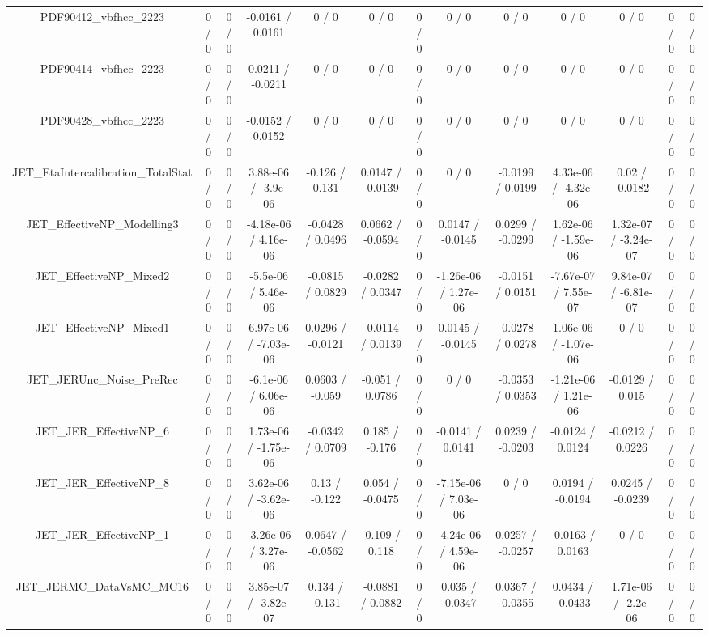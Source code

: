 \documentclass[10pt]{article}
\begin{document}
\begin{table}[htbp]
\begin{center}
\begin{tabular}{|c|c|c|c|c|c|c|c|c|c|c|c|c|}
  PDF90412_vbfhcc_2223 & 0 / 0 & 0 / 0 & -0.0161 / 0.0161 & 0 / 0 & 0 / 0 & 0 / 0 & 0 / 0 & 0 / 0 & 0 / 0 & 0 / 0 & 0 / 0 & 0 / 0 \\ 
  PDF90414_vbfhcc_2223 & 0 / 0 & 0 / 0 & 0.0211 / -0.0211 & 0 / 0 & 0 / 0 & 0 / 0 & 0 / 0 & 0 / 0 & 0 / 0 & 0 / 0 & 0 / 0 & 0 / 0 \\ 
  PDF90428_vbfhcc_2223 & 0 / 0 & 0 / 0 & -0.0152 / 0.0152 & 0 / 0 & 0 / 0 & 0 / 0 & 0 / 0 & 0 / 0 & 0 / 0 & 0 / 0 & 0 / 0 & 0 / 0 \\ 
  JET_EtaIntercalibration_TotalStat & 0 / 0 & 0 / 0 & 3.88e-06 / -3.9e-06 & -0.126 / 0.131 & 0.0147 / -0.0139 & 0 / 0 & 0 / 0 & -0.0199 / 0.0199 & 4.33e-06 / -4.32e-06 & 0.02 / -0.0182 & 0 / 0 & 0 / 0 \\ 
  JET_EffectiveNP_Modelling3 & 0 / 0 & 0 / 0 & -4.18e-06 / 4.16e-06 & -0.0428 / 0.0496 & 0.0662 / -0.0594 & 0 / 0 & 0.0147 / -0.0145 & 0.0299 / -0.0299 & 1.62e-06 / -1.59e-06 & 1.32e-07 / -3.24e-07 & 0 / 0 & 0 / 0 \\ 
  JET_EffectiveNP_Mixed2 & 0 / 0 & 0 / 0 & -5.5e-06 / 5.46e-06 & -0.0815 / 0.0829 & -0.0282 / 0.0347 & 0 / 0 & -1.26e-06 / 1.27e-06 & -0.0151 / 0.0151 & -7.67e-07 / 7.55e-07 & 9.84e-07 / -6.81e-07 & 0 / 0 & 0 / 0 \\ 
  JET_EffectiveNP_Mixed1 & 0 / 0 & 0 / 0 & 6.97e-06 / -7.03e-06 & 0.0296 / -0.0121 & -0.0114 / 0.0139 & 0 / 0 & 0.0145 / -0.0145 & -0.0278 / 0.0278 & 1.06e-06 / -1.07e-06 & 0 / 0 & 0 / 0 & 0 / 0 \\ 
  JET_JERUnc_Noise_PreRec & 0 / 0 & 0 / 0 & -6.1e-06 / 6.06e-06 & 0.0603 / -0.059 & -0.051 / 0.0786 & 0 / 0 & 0 / 0 & -0.0353 / 0.0353 & -1.21e-06 / 1.21e-06 & -0.0129 / 0.015 & 0 / 0 & 0 / 0 \\ 
  JET_JER_EffectiveNP_6 & 0 / 0 & 0 / 0 & 1.73e-06 / -1.75e-06 & -0.0342 / 0.0709 & 0.185 / -0.176 & 0 / 0 & -0.0141 / 0.0141 & 0.0239 / -0.0203 & -0.0124 / 0.0124 & -0.0212 / 0.0226 & 0 / 0 & 0 / 0 \\ 
  JET_JER_EffectiveNP_8 & 0 / 0 & 0 / 0 & 3.62e-06 / -3.62e-06 & 0.13 / -0.122 & 0.054 / -0.0475 & 0 / 0 & -7.15e-06 / 7.03e-06 & 0 / 0 & 0.0194 / -0.0194 & 0.0245 / -0.0239 & 0 / 0 & 0 / 0 \\ 
  JET_JER_EffectiveNP_1 & 0 / 0 & 0 / 0 & -3.26e-06 / 3.27e-06 & 0.0647 / -0.0562 & -0.109 / 0.118 & 0 / 0 & -4.24e-06 / 4.59e-06 & 0.0257 / -0.0257 & -0.0163 / 0.0163 & 0 / 0 & 0 / 0 & 0 / 0 \\ 
  JET_JERMC_DataVsMC_MC16 & 0 / 0 & 0 / 0 & 3.85e-07 / -3.82e-07 & 0.134 / -0.131 & -0.0881 / 0.0882 & 0 / 0 & 0.035 / -0.0347 & 0.0367 / -0.0355 & 0.0434 / -0.0433 & 1.71e-06 / -2.2e-06 & 0 / 0 & 0 / 0 \\ 

\end{tabular}
\end{center}
\end{table}
\end{document}
